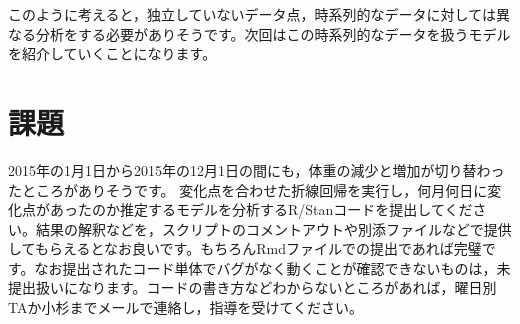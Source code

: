 \documentclass{ltjsbook}
\begin{document}
このように考えると，独立していないデータ点，時系列的なデータに対しては異なる分析をする必要がありそうです。次回はこの時系列的なデータを扱うモデルを紹介していくことになります。

\section{課題}
2015年の1月1日から2015年の12月1日の間にも，体重の減少と増加が切り替わったところがありそうです。
変化点を合わせた折線回帰を実行し，何月何日に変化点があったのか推定するモデルを分析するR/Stanコードを提出してください。結果の解釈などを，スクリプトのコメントアウトや別添ファイルなどで提供してもらえるとなお良いです。もちろんRmdファイルでの提出であれば完璧です。なお提出されたコード単体でバグがなく動くことが確認できないものは，未提出扱いになります。コードの書き方などわからないところがあれば，曜日別TAか小杉までメールで連絡し，指導を受けてください。
\end{document}

